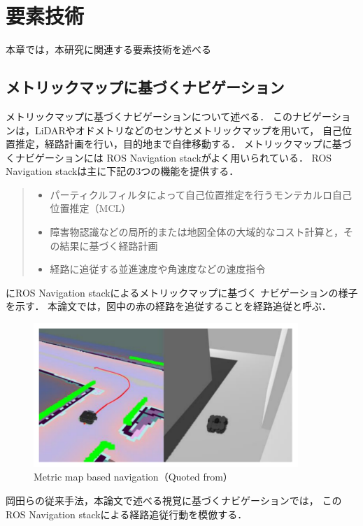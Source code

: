 \chapter{要素技術}
\label{chap:elemental}
本章では，本研究に関連する要素技術を述べる
\section{メトリックマップに基づくナビゲーション}
メトリックマップに基づくナビゲーションについて述べる．
このナビゲーションは，LiDARやオドメトリなどのセンサとメトリックマップを用いて，
自己位置推定，経路計画を行い，目的地まで自律移動する．
メトリックマップに基づくナビゲーションには
ROS Navigation stack\cite{ros}がよく用いられている．
ROS Navigation stackは主に下記の3つの機能を提供する．
\begin{quote}
    \begin{itemize}
     \item パーティクルフィルタによって自己位置推定を行うモンテカルロ自己位置推定（MCL）
     \item 障害物認識などの局所的または地図全体の大域的なコスト計算と，その結果に基づく経路計画
     \item 経路に追従する並進速度や角速度などの速度指令
    \end{itemize}
   \end{quote}
にROS Navigation stackによるメトリックマップに基づく
ナビゲーションの様子を示す．
本論文では，図中の赤の経路を追従することを経路追従と呼ぶ．
\begin{figure}[htbp]
    \centering
     \includegraphics[width=100mm]{images/pdf/nav.pdf}
     \caption[Metric map based navigation]{Metric map based navigation（Quoted from\cite{shimada2020}）}
     \label{fig:nav}
\end{figure}
岡田らの従来手法，本論文で述べる視覚に基づくナビゲーションでは，
このROS Navigation stackによる経路追従行動を模倣する．

